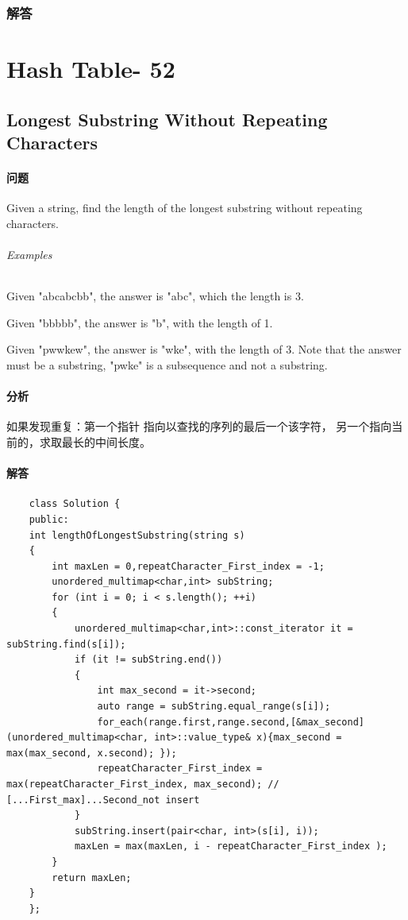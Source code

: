\documentclass[UTF8,a4paper,12pt]{ctexbook}
\begin{document}
	\subsection{解答}
	
\chapter{Hash Table- 52}
\section{Longest Substring Without Repeating Characters}
	\subsubsection{问题}
	Given a string, find the length of the longest substring without repeating characters.
	
	\subparagraph{Examples}		
	Given "abcabcbb", the answer is "abc", which the length is 3.
	
	Given "bbbbb", the answer is "b", with the length of 1.
	
	Given "pwwkew", the answer is "wke", with the length of 3. Note that the answer must be a substring, "pwke" is a subsequence and not a substring.
	
	\subsubsection{分析}
	如果发现重复：第一个指针 指向以查找的序列的最后一个该字符， 另一个指向当前的，求取最长的中间长度。
	\subsubsection{解答}
	\begin{lstlisting}
	class Solution {
	public:
	int lengthOfLongestSubstring(string s) 
	{
		int maxLen = 0,repeatCharacter_First_index = -1;
		unordered_multimap<char,int> subString;
		for (int i = 0; i < s.length(); ++i)
		{
			unordered_multimap<char,int>::const_iterator it = subString.find(s[i]);
			if (it != subString.end())
			{
				int max_second = it->second;
				auto range = subString.equal_range(s[i]);
				for_each(range.first,range.second,[&max_second](unordered_multimap<char, int>::value_type& x){max_second = max(max_second, x.second); });
				repeatCharacter_First_index = max(repeatCharacter_First_index, max_second);	// [...First_max]...Second_not insert
			}
			subString.insert(pair<char, int>(s[i], i));
			maxLen = max(maxLen, i - repeatCharacter_First_index );
		}
		return maxLen;
	}
	};
	\end{lstlisting}
	
\end{document}
